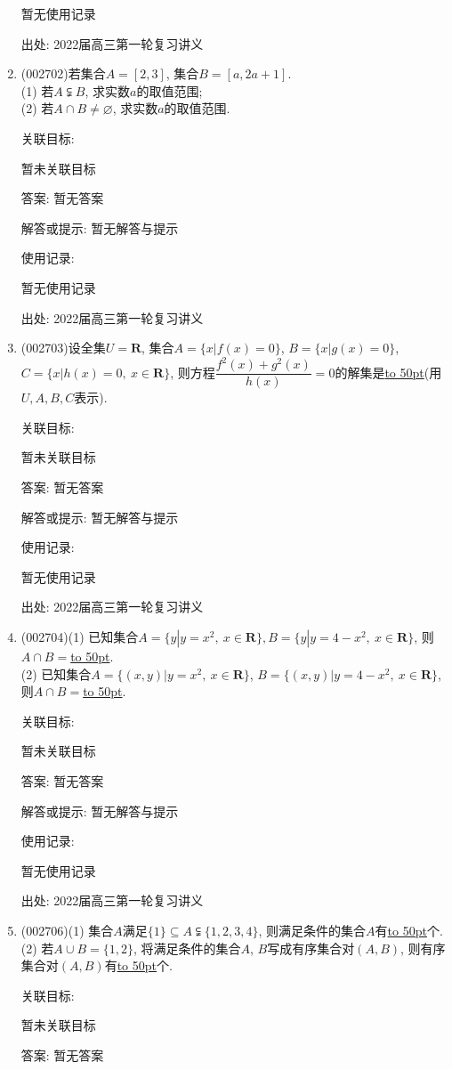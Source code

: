 \documentclass[10pt,a4paper]{article}
\newcommand{\blank}[1]{\underline{\hbox to #1pt{}}}
\begin{document}
\begin{enumerate}[1.]
暂无使用记录


出处: 2022届高三第一轮复习讲义
\item { (002702)}若集合$A=[2,3]$, 集合$B=[a,2a+1]$.\\
(1) 若$A\subsetneqq B$, 求实数$a$的取值范围;\\
(2) 若$A\cap B\ne \varnothing$, 求实数$a$的取值范围.


关联目标:

暂未关联目标

答案: 暂无答案

解答或提示: 暂无解答与提示

使用记录:

暂无使用记录


出处: 2022届高三第一轮复习讲义
\item { (002703)}设全集$U=\mathbf{R}$, 集合$A=\{x|f(x)=0\}$, $B=\{x|g(x)=0\}$, $C=\{x|h(x)=0, \ x\in \mathbf{R}\}$, 则方程$\dfrac{f^2(x)+g^2(x)}{h(x)}=0$的解集是\blank{50}(用$U,A,B,C$表示).


关联目标:

暂未关联目标

答案: 暂无答案

解答或提示: 暂无解答与提示

使用记录:

暂无使用记录


出处: 2022届高三第一轮复习讲义
\item { (002704)}(1) 已知集合$A=\{y|y=x^2, \ x\in \mathbf{R}\}, B=\{y|y=4-x^2, \ x\in \mathbf{R}\}$, 则$A\cap B=$\blank{50}.\\
(2) 已知集合$A=\{(x,y)|y={x^2},\ x\in \mathbf{R}\}$, $B=\{(x,y)|y=4-x^2, \ x\in \mathbf{R}\}$, 则$A\cap B=$\blank{50}.


关联目标:

暂未关联目标

答案: 暂无答案

解答或提示: 暂无解答与提示

使用记录:

暂无使用记录


出处: 2022届高三第一轮复习讲义
\item { (002706)}(1) 集合$A$满足$\{1\}\subseteq A \subsetneqq \{1,2,3,4\}$, 则满足条件的集合$A$有\blank{50}个.
(2) 若$A\cup B=\{1,2\}$, 将满足条件的集合$A$, $B$写成有序集合对$(A,B)$, 则有序集合对$(A,B)$有\blank{50}个.


关联目标:

暂未关联目标

答案: 暂无答案


\end{enumerate}
\end{document}
